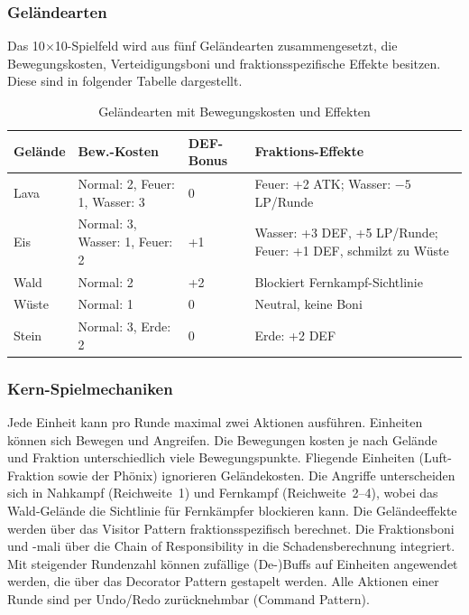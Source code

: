 \subsubsection{Geländearten}
\label{subsec:gelaendearten}

Das 10$\times$10-Spielfeld wird aus fünf Geländearten zusammengesetzt, die Bewegungskosten, Verteidigungsboni und
fraktionsspezifische Effekte besitzen. Diese sind in folgender Tabelle dargestellt.

\begin{table}[H]
\centering
\begin{tabular}{l l l p{5.5cm}}
\toprule
\textbf{Gelände} & \textbf{Bew.-Kosten} & \textbf{DEF-Bonus} & \textbf{Fraktions-Effekte} \\
\midrule
Lava  & Normal: 2, Feuer: 1, Wasser: 3 & 0 & Feuer: +2 ATK; Wasser: $-5$ LP/Runde \\
Eis   & Normal: 3, Wasser: 1, Feuer: 2 & +1 & Wasser: +3 DEF, +5 LP/Runde; Feuer: +1 DEF, schmilzt zu Wüste \\
Wald  & Normal: 2 & +2 & Blockiert Fernkampf-Sichtlinie \\
Wüste & Normal: 1 & 0 & Neutral, keine Boni \\
Stein & Normal: 3, Erde: 2 & 0 & Erde: +2 DEF \\
\bottomrule
\end{tabular}
\caption{Geländearten mit Bewegungskosten und Effekten}
\label{tab:gelaende}
\end{table}

\subsubsection{Kern-Spielmechaniken}
\label{subsec:kern-spielmechaniken}

Jede Einheit kann pro Runde maximal zwei Aktionen ausführen. Einheiten können sich Bewegen und Angreifen.
Die Bewegungen kosten je nach Gelände und Fraktion unterschiedlich viele Bewegungspunkte. Fliegende Einheiten (Luft-Fraktion
sowie der Phönix) ignorieren Geländekosten.
Die Angriffe unterscheiden sich in Nahkampf (Reichweite~1) und Fernkampf (Reichweite~2--4), wobei das Wald-Gelände die
Sichtlinie für Fernkämpfer blockieren kann.
Die Geländeeffekte werden über das Visitor Pattern fraktionsspezifisch berechnet. Die Fraktionsboni und -mali über die
Chain of Responsibility in die Schadensberechnung integriert.
Mit steigender Rundenzahl können zufällige (De-)Buffs auf Einheiten angewendet werden, die über das Decorator Pattern
gestapelt werden.
Alle Aktionen einer Runde sind per Undo/Redo zurücknehmbar (Command Pattern).
